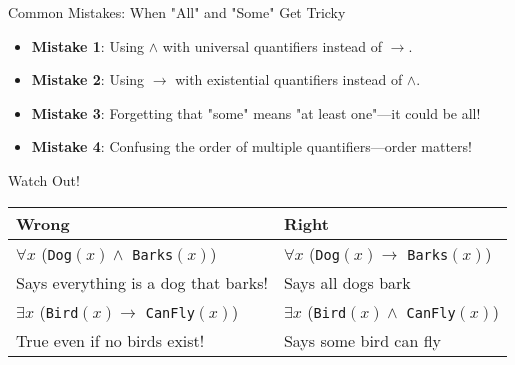 \documentclass{beamer}
\begin{document}
	\begin{frame}{Common Mistakes: When "All" and "Some" Get Tricky}
		\begin{itemize}
			\item \textbf{Mistake 1}: Using $\land$ with universal quantifiers instead of $\rightarrow$.
			\item \textbf{Mistake 2}: Using $\rightarrow$ with existential quantifiers instead of $\land$.
			\item \textbf{Mistake 3}: Forgetting that "some" means "at least one"—it could be all!
			\item \textbf{Mistake 4}: Confusing the order of multiple quantifiers—order matters!
		\end{itemize}
		
		\begin{alertblock}{Watch Out!}
			\begin{tabular}{|l|l|}
				\hline
				\textbf{Wrong} & \textbf{Right} \\
				\hline
				$\forall x$ (\texttt{Dog}$(x) \land$ \texttt{Barks}$(x)$) & $\forall x$ (\texttt{Dog}$(x) \rightarrow$ \texttt{Barks}$(x)$) \\
				Says everything is a dog that barks! & Says all dogs bark \\
				\hline
				$\exists x$ (\texttt{Bird}$(x) \rightarrow$ \texttt{CanFly}$(x)$) & $\exists x$ (\texttt{Bird}$(x) \land$ \texttt{CanFly}$(x)$) \\
				True even if no birds exist! & Says some bird can fly \\
				\hline
			\end{tabular}
		\end{alertblock}
	\end{frame}
	
\end{document}
